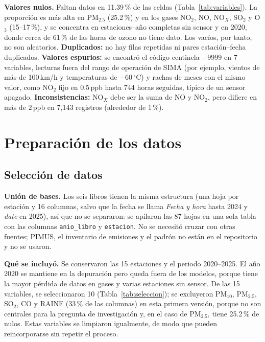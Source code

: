 \documentclass[11pt,letterpaper]{article}
\begin{document}
\textbf{Valores nulos.} Faltan datos en 11.39\,\% de las celdas (Tabla~\ref{tab:variables}). La proporci\'on es m\'as alta en PM$_{2.5}$ (25.2\,\%) y en los gases NO$_2$, NO, NO$_X$, SO$_2$ y O$_3$ (15--17\,\%), y se concentra en estaciones--a\~no completas sin sensor y en 2020, donde cerca de 61\,\% de las horas de ozono no tiene dato. Los vac\'ios, por tanto, no son aleatorios. \textbf{Duplicados:} no hay filas repetidas ni pares estaci\'on--fecha duplicados. \textbf{Valores espurios:} se encontr\'o el c\'odigo centinela $-9999$ en 7 variables, lecturas fuera del rango de operaci\'on de SIMA (por ejemplo, vientos de m\'as de 100\,km/h y temperaturas de $-60\,^\circ$C) y rachas de meses con el mismo valor, como NO$_2$ fijo en 0.5\,ppb hasta 744 horas seguidas, t\'ipico de un sensor apagado. \textbf{Inconsistencias:} NO$_X$ debe ser la suma de NO y NO$_2$, pero difiere en m\'as de 2\,ppb en 7,143 registros (alrededor de 1\,\%).

\section{Preparaci\'on de los datos}

\subsection{Selecci\'on de datos}
\textbf{Uni\'on de bases.} Los seis libros tienen la misma estructura (una hoja por estaci\'on y 16 columnas, salvo que la fecha se llama \textit{Fecha y hora} hasta 2024 y \textit{date} en 2025), as\'i que no se separaron: se apilaron las 87 hojas en una sola tabla con las columnas \texttt{anio\_libro} y \texttt{estacion}. No se necesit\'o cruzar con otras fuentes; PIMUS, el inventario de emisiones y el padr\'on no est\'an en el repositorio y no se usaron.

\textbf{Qu\'e se incluy\'o.} Se conservaron las 15 estaciones y el periodo 2020--2025. El a\~no 2020 se mantiene en la depuraci\'on pero queda fuera de los modelos, porque tiene la mayor p\'erdida de datos en gases y varias estaciones sin sensor. De las 15 variables, se seleccionaron 10 (Tabla~\ref{tab:seleccion}); se excluyeron PM$_{10}$, PM$_{2.5}$, SO$_2$, CO y RAINF (33\,\% de las columnas) en esta primera versi\'on, porque no son centrales para la pregunta de investigaci\'on y, en el caso de PM$_{2.5}$, tiene 25.2\,\% de nulos. Estas variables se limpiaron igualmente, de modo que pueden reincorporarse sin repetir el proceso.
\end{document}
